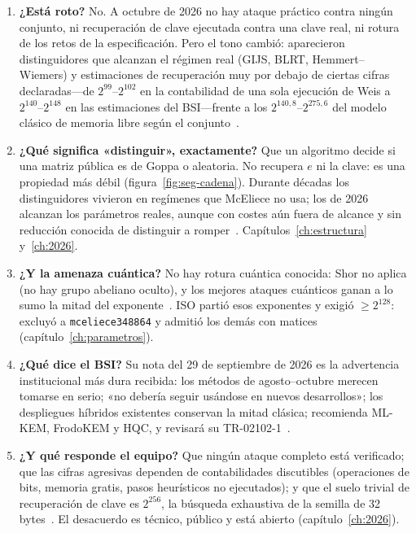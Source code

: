 \begin{enumerate}[leftmargin=1.9em,itemsep=5pt,start=12]
  \item \textbf{¿Está roto?} No. A octubre de 2026 no hay ataque
        práctico contra ningún conjunto, ni recuperación de clave
        ejecutada contra una clave real, ni rotura de los retos de
        la especificación. Pero el tono cambió: aparecieron
        distinguidores que alcanzan el régimen real (GIJS, BLRT,
        Hemmert--Wiemers) y estimaciones de recuperación muy por
        debajo de ciertas cifras declaradas---de $2^{99}$--$2^{102}$
        en la contabilidad de una sola ejecución de Weis a
        $2^{140}$--$2^{148}$ en las estimaciones del BSI---frente a
        los $2^{140{,}8}$--$2^{275{,}6}$ del modelo clásico de
        memoria libre según el conjunto~\cite{ghoshal2026,weis2026,bsi2026}.

  \item \textbf{¿Qué significa «distinguir», exactamente?} Que un
        algoritmo decide si una matriz pública es de Goppa o
        aleatoria. No recupera $e$ ni la clave: es una propiedad más
        débil (figura~\ref{fig:seg-cadena}). Durante décadas los
        distinguidores vivieron en regímenes que McEliece no usa;
        los de 2026 alcanzan los parámetros reales, aunque con
        costes aún fuera de alcance y sin reducción conocida de
        distinguir a romper~\cite{ghoshal2026}.
        Capítulos~\ref{ch:estructura} y~\ref{ch:2026}.

  \item \textbf{¿Y la amenaza cuántica?} No hay rotura cuántica
        conocida: Shor no aplica (no hay grupo abeliano oculto), y
        los mejores ataques cuánticos ganan a lo sumo la mitad del
        exponente~\cite{kachigar2017}. ISO partió esos exponentes y
        exigió $\ge2^{128}$: excluyó a \texttt{mceliece348864} y
        admitió los demás con matices~\cite{iso18033,cmiso}
        (capítulo~\ref{ch:parametros}).

  \item \textbf{¿Qué dice el BSI?} Su nota del 29 de septiembre de
        2026 es la advertencia institucional más dura recibida: los
        métodos de agosto--octubre merecen tomarse en serio; «no
        debería seguir usándose en nuevos desarrollos»; los
        despliegues híbridos existentes conservan la mitad clásica;
        recomienda ML-KEM, FrodoKEM y HQC, y revisará su
        TR-02102-1~\cite{bsi2026}.

  \item \textbf{¿Y qué responde el equipo?} Que ningún ataque
        completo está verificado; que las cifras agresivas dependen
        de contabilidades discutibles (operaciones de bits, memoria
        gratis, pasos heurísticos no ejecutados); y que el suelo
        trivial de recuperación de clave es $2^{256}$, la búsqueda
        exhaustiva de la semilla de 32 bytes~\cite{cm529,cm610,bernstein2026}.
        El desacuerdo es técnico, público y está abierto
        (capítulo~\ref{ch:2026}).
\end{enumerate}


